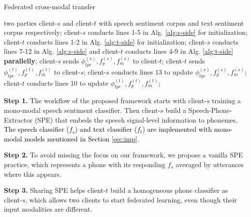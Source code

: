 \documentclass[11pt]{article}
\begin{document}
\setlength{\textfloatsep}{0pt}
\begin{algorithm}[ht]
\caption{Federated cross-modal transfer}
\label{alg:framework}
\begin{algorithmic}[1]
    \Require two parties client-$s$ and client-$t$ with speech sentiment corpus and text sentiment corpus respectively;
    \State client-$s$ conducts lines 1-5 in Alg. \ref{alg:s-side} for initialization;
    \State client-$t$ conducts lines 1-2 in Alg. \ref{alg:t-side} for initialization;
        \State client-$s$ conducts lines 7-12 in Alg. \ref{alg:s-side} and client-$t$ conducts lines 4-9 in Alg. \ref{alg:t-side} \textbf{parallelly};
        \State client-$s$ sends ${\phi}_{tpe}^{(s)}, {f}_{p}^{(s)}, {f}_m^{(s)}$ to client-$t$;
        \State client-$t$ sends ${\phi}_{tpe}^{(t)}, {f}_{p}^{(t)}, {f}_m^{(t)}$ to client-$s$;
        \State client-$s$ conducts lines 13 to update ${\phi}_{tpe}^{(s)}, {f}_{p}^{(s)}, {f}_m^{(s)}$;
        \State client-$t$ conducts lines 10 to update ${\phi}_{tpe}^{(t)}, {f}_{p}^{(t)}, {f}_m^{(t)}$;
    \EndWhile
\end{algorithmic}
\end{algorithm} %

\textbf{Step 1.} The workflow of the proposed framework starts with client-$s$ training a mono-modal speech sentiment classifier. Then client-$s$ build a Speech-Phone-Extractor (SPE) that embeds the speech signal-level information to phonemes. \textcolor{black}{The speech classifier (${f}_s$) and text classifier (${f}_t$) are implemented with mono-modal models mentioned in Section \ref{sec:imp}.}

\textbf{Step 2.} To avoid missing the focus on our framework, we propose a vanilla SPE practice, which represents a phone with its responding $f_s$ averaged by utterances where this  appears.

\textbf{Step 3.} Sharing SPE helps client-$t$ build a homogeneous phone classifier as client-$s$, which allows two clients to start federated learning, even though their input modalities are different.
\end{document}
